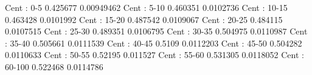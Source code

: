 Cent : 0-5
0.425677 0.00949462
Cent : 5-10
0.460351 0.0102736
Cent : 10-15
0.463428 0.0101992
Cent : 15-20
0.487542 0.0109067
Cent : 20-25
0.484115 0.0107515
Cent : 25-30
0.489351 0.0106795
Cent : 30-35
0.504975 0.0110987
Cent : 35-40
0.505661 0.0111539
Cent : 40-45
0.5109 0.0112203
Cent : 45-50
0.504282 0.0110633
Cent : 50-55
0.52195 0.011527
Cent : 55-60
0.531305 0.0118052
Cent : 60-100
0.522468 0.0114786
